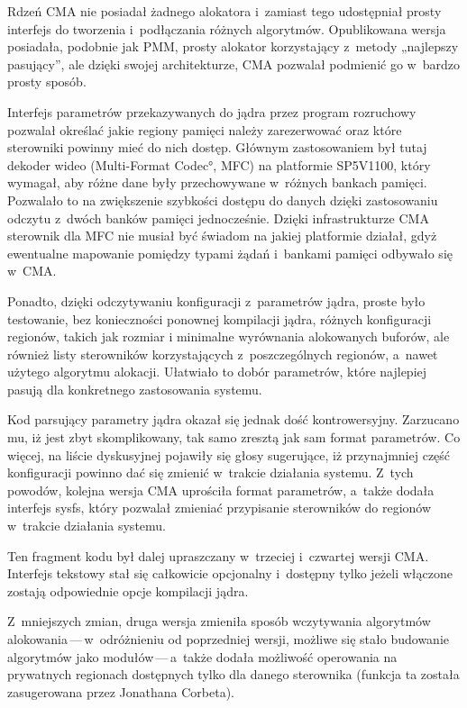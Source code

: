 Rdzeń CMA nie posiadał żadnego alokatora i~zamiast tego udostępniał
prosty interfejs do tworzenia i~podłączania różnych algorytmów.
Opublikowana wersja posiadała, podobnie jak PMM, prosty alokator
korzystający z~metody „najlepszy pasujący”, ale dzięki swojej
architekturze, CMA pozwalał podmienić go w~bardzo prosty sposób.

Interfejs parametrów przekazywanych do jądra przez program rozruchowy
pozwalał określać jakie regiony pamięci należy zarezerwować oraz które
sterowniki powinny mieć do nich dostęp.  Głównym zastosowaniem był
tutaj dekoder wideo (\ang{Multi-Format Codec}, MFC) na platformie
SP5V1100, który wymagał, aby różne dane były przechowywane w~różnych
bankach pamięci.  Pozwalało to na zwiększenie szybkości dostępu do
danych dzięki zastosowaniu odczytu z~dwóch banków pamięci
jednocześnie.  Dzięki infrastrukturze CMA sterownik dla MFC nie musiał
być świadom na jakiej platformie działał, gdyż ewentualne mapowanie
pomiędzy typami żądań i~bankami pamięci odbywało się w~CMA.

Ponadto, dzięki odczytywaniu konfiguracji z~parametrów jądra, proste
było testowanie, bez konieczności ponownej kompilacji jądra, różnych
konfiguracji regionów, takich jak rozmiar i minimalne wyrównania
alokowanych buforów, ale również listy sterowników korzystających
z~poszczególnych regionów, a~nawet użytego algorytmu alokacji.
Ułatwiało to dobór parametrów, które najlepiej pasują dla konkretnego
zastosowania systemu.

Kod parsujący parametry jądra okazał się jednak dość kontrowersyjny.
Zarzucano mu, iż jest zbyt skomplikowany, tak samo zresztą jak sam
format parametrów.  Co więcej, na liście dyskusyjnej pojawiły się
głosy sugerujące, iż przynajmniej część konfiguracji powinno dać się
zmienić w~trakcie działania systemu.  Z~tych powodów, kolejna wersja
CMA uprościła format parametrów, a~także dodała interfejs sysfs, który
pozwalał zmieniać przypisanie sterowników do regionów w~trakcie
działania systemu.

Ten fragment kodu był dalej upraszczany w~trzeciej i~czwartej wersji
CMA.  Interfejs tekstowy stał się całkowicie opcjonalny i~dostępny
tylko jeżeli włączone zostają odpowiednie opcje kompilacji jądra.

Z~mniejszych zmian, druga wersja zmieniła sposób wczytywania
algorytmów alokowania\,---\,w~odróżnieniu od poprzedniej wersji, możliwe
się stało budowanie algorytmów jako modułów\,---\,a~także dodała
możliwość operowania na prywatnych regionach dostępnych tylko dla
danego sterownika (funkcja ta została zasugerowana przez Jonathana
Corbeta).

